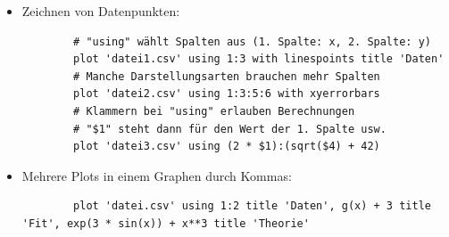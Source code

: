 \begin{frame}[<+->][fragile]
	\begin{itemize}
		\item Zeichnen von Datenpunkten:
		\begin{lstlisting}
		# "using" wählt Spalten aus (1. Spalte: x, 2. Spalte: y)
		plot 'datei1.csv' using 1:3 with linespoints title 'Daten'
		# Manche Darstellungsarten brauchen mehr Spalten
		plot 'datei2.csv' using 1:3:5:6 with xyerrorbars
		# Klammern bei "using" erlauben Berechnungen
		# "$1" steht dann für den Wert der 1. Spalte usw.
		plot 'datei3.csv' using (2 * $1):(sqrt($4) + 42)
		\end{lstlisting}
		
		\item Mehrere Plots in einem Graphen durch Kommas:
		\begin{lstlisting}
		plot 'datei.csv' using 1:2 title 'Daten', g(x) + 3 title 'Fit', exp(3 * sin(x)) + x**3 title 'Theorie'
		\end{lstlisting}
	\end{itemize}
\end{frame}

